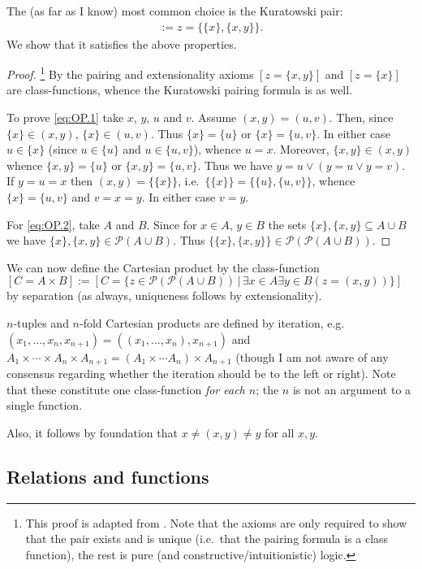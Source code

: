 \documentclass{scrartcl}
\theoremstyle{definition}
\theoremstyle{plain}
\theoremstyle{remark}
\newcommand{\Pow}{\mathcal{P}}
\newcommand{\sep}{\,|\,}
\newcommand{\eqdef}{:=}
\begin{document}
The (as far as I know) most common choice is the Kuratowski pair:
\begin{align*}
  [z = (x,y)] \eqdef z = \{\{x\},\{x,y\}\}\mbox{.}
\end{align*}
We show that it satisfies the above properties.
\begin{proof}\footnote{This proof is adapted from \cite{aczel_rathjen:2001}. Note that the axioms are only required to show that the pair exists and is unique (i.e.~that the pairing formula is a class function), the rest is pure (and constructive/intuitionistic) logic.}
  By the pairing and extensionality axioms $[z = \{x,y\}]$ and $[z = \{x\}]$ are class-functions, whence the Kuratowski pairing formula is as well.

  To prove \eqref{eq:OP.1} take $x$, $y$, $u$ and $v$. Assume $(x,y) = (u,v)$. Then, since $\{x\} \in (x,y)$, $\{x\} \in (u,v)$. Thus $\{x\} = \{u\}$ or $\{x\} = \{u,v\}$. In either case $u \in \{x\}$ (since $u \in \{u\}$ and $u \in \{u,v\}$), whence $u = x$. Moreover, $\{x,y\} \in (x,y)$ whence $\{x,y\} = \{u\}$ or $\{x,y\} = \{u,v\}$. Thus we have $y = u \lor (y = u \lor y = v)$. If $y = u = x$ then $(x,y) = \{\{x\}\}$, i.e.~$\{\{x\}\} = \{\{u\},\{u,v\}\}$, whence $\{x\} = \{u,v\}$ and $v = x = y$. In either case $v = y$.

  For \eqref{eq:OP.2}, take $A$ and $B$. Since for $x \in A$, $y \in B$ the sets $\{x\},\{x,y\} \subseteq A \cup B$ we have $\{x\},\{x,y\} \in \Pow(A \cup B)$. Thus $\{\{x\},\{x,y\}\} \in \Pow(\Pow(A \cup B))$.
\end{proof}

We can now define the Cartesian product by the class-function $[C = A \times B] \eqdef [C = \{z \in \Pow(\Pow(A \cup B)) \sep \exists x \in A \exists y \in B (z = (x,y))\}]$ by separation (as always, uniqueness follows by extensionality).

$n$-tuples and $n$-fold Cartesian products are defined by iteration, e.g.~$(x_1,\dotsc,x_n,x_{n + 1}) = ((x_1,\dotsc,x_n),x_{n + 1})$ and $A_1 \times \dotsb \times A_n \times A_{n + 1} = (A_1 \times \dotsb A_n) \times A_{n + 1}$ (though I am not aware of any consensus regarding whether the iteration should be to the left or right). Note that these constitute one class-function \emph{for each $n$}; the $n$ is not an argument to a single function.

Also, it follows by foundation that $x \not= (x,y) \not= y$ for all $x,y$.

\subsection{Relations and functions}
\label{subsec:rel}
\end{document}
